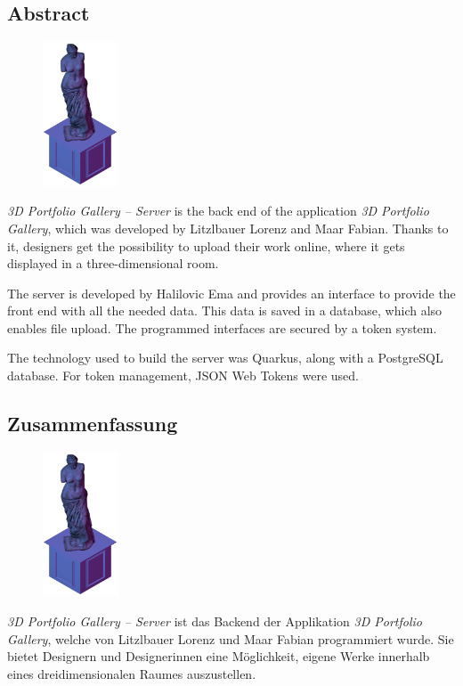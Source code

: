\begin{spacing}{1}
    \chapter*{Abstract}
\end{spacing}
\begin{figure}
    \begin{center}
      \includegraphics[width=0.2\textwidth]{pics/statue.png}
    \end{center}
\end{figure}
\emph{3D Portfolio Gallery – Server} is the back end of the application \emph{3D Portfolio Gallery}, which was developed by Litzlbauer Lorenz and Maar Fabian.
Thanks to it, designers get the possibility to upload their work online, where it gets displayed in a three-dimensional room.


The server is developed by Halilovic Ema and provides an interface to provide the front end with all the needed data. 
This data is saved in a database, which also enables file upload. 
The programmed interfaces are secured by a token system.


The technology used to build the server was Quarkus, along with a PostgreSQL database.
For token management, JSON Web Tokens were used.
\newpage
\begin{spacing}{1}
    \chapter*{Zusammenfassung}
\end{spacing}
\begin{figure}
    \begin{center}
      \includegraphics[width=0.2\textwidth]{pics/statue.png}
    \end{center}
\end{figure}
\emph{3D Portfolio Gallery – Server} ist das Backend der Applikation \emph{3D Portfolio Gallery}, welche von Litzlbauer Lorenz und Maar Fabian programmiert wurde. 
Sie bietet Designern und Designerinnen eine Möglichkeit, eigene Werke innerhalb eines dreidimensionalen Raumes auszustellen. 


